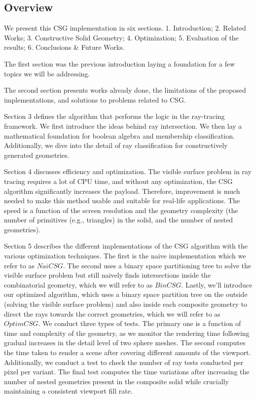 \documentclass[a4paper,11pt,oneside]{article}
\begin{document}
\subsection{Overview}
  
We present this CSG implementation in six sections. 1. Introduction;  2. Related Works; 3. Constructive Solid Geometry; 4. Optimization; 5. Evaluation of the results; 6. Conclusions \& Future Works.

The first section was the previous introduction laying a foundation for a few topics we will be addressing. 
  
The second section presents works already done, the limitations of the proposed implementations, and solutions to problems related to CSG.
  
Section 3 defines the algorithm that performs the logic in the ray-tracing framework. We first introduce the ideas behind ray intersection. We then lay a mathematical foundation for boolean algebra and membership classification. Additionally, we dive into the detail of ray classification for constructively generated geometries. 
  
Section 4 discusses efficiency and optimization. The visible surface problem in ray tracing requires a lot of CPU time, and without any optimization, the CSG algorithm significantly increases the payload. Therefore, improvement is much needed to make this method usable and suitable for real-life applications. The speed is a function of the screen resolution and the geometry complexity (the number of primitives (e.g., triangles) in the solid, and the number of nested geometries).
  
Section 5 describes the different implementations of the CSG algorithm with the various optimization techniques. The first is the naive implementation which we refer to as $NaiCSG$. The second uses a binary space partitioning tree to solve the visible surface problem but still naively finds intersections inside the combinatorial geometry, which we will refer to as $BinCSG$. Lastly, we'll introduce our optimized algorithm, which uses a binary space partition tree on the outside (solving the visible surface problem) and also inside each composite geometry to direct the rays towards the correct geometries, which we will refer to as $OptimCSG$. We conduct three types of tests. The primary one is a function of time and complexity of the geometry, as we monitor the rendering time following gradual increases in the detail level of two sphere meshes. The second computes the time taken to render a scene after covering different amounts of the viewport. Additionally, we conduct a test to check the number of ray tests conducted per pixel per variant. The final test computes the time variations after increasing the number of nested geometries present in the composite solid while crucially maintaining a consistent viewport fill rate.
  
\end{document}
